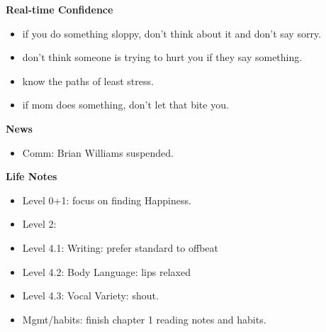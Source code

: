 \documentclass[11pt]{article}
\begin{document}
{            %
            \textbf{Real-time Confidence}\\
            \begin{itemize}
              \tiny \item \tiny if you do something sloppy, don't
              think about it and don't say sorry.
            \item \tiny don't think someone is trying to hurt you if
              they say something.
            \item \tiny know the paths of least stress.
            \item \tiny if mom does something, don't let that bite
              you. 
            \end{itemize}

            \textbf{News} 
            \begin{itemize}
            \item \tiny Comm: Brian Williams suspended. 
            \end{itemize} 
    
            \textbf{Life Notes}
            \begin{itemize}
              \tiny \item \tiny Level 0+1: focus on finding Happiness.
            \item \tiny Level 2:
            \item \tiny Level 4.1: Writing: prefer standard to offbeat
            \item \tiny Level 4.2: Body Language: lips relaxed
            \item \tiny Level 4.3: Vocal Variety: shout.
            \item \tiny Mgmt/habits: finish chapter 1 reading notes and habits.
            \end{itemize} 
            \newpage

}
\end{document}
